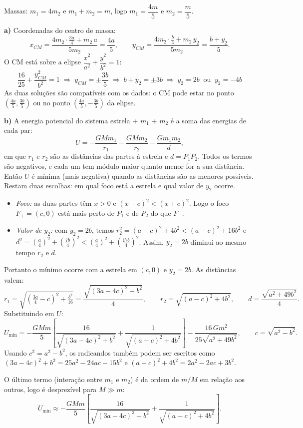 \documentclass{article}%
\begin{document}
Massas: $m_1=4m_2$ e $m_1+m_2=m$, logo $m_1=\dfrac{4m}{5}$ e $m_2=\dfrac{m}{5}$.

\textbf{a)} Coordenadas do centro de massa:
\[
x_{CM}=\frac{4m_2\cdot\frac{3a}{4}+m_2\,a}{5m_2}=\frac{4a}{5},\qquad
y_{CM}=\frac{4m_2\cdot\frac{b}{4}+m_2\,y_2}{5m_2}=\frac{b+y_2}{5}.
\]
O CM está sobre a elipse $\dfrac{x^2}{a^2}+\dfrac{y^2}{b^2}=1$:
\[
\frac{16}{25}+\frac{y_{CM}^2}{b^2}=1\;\Rightarrow\; y_{CM}=\pm\frac{3b}{5}
\;\Rightarrow\; b+y_2=\pm 3b\;\Rightarrow\;
\boxed{y_2=2b\ \text{ ou }\ y_2=-4b}
\]
As duas soluções são compatíveis com os dados: o CM pode estar no ponto $\left(\frac{4a}{5},\frac{3b}{5}\right)$ ou no ponto $\left(\frac{4a}{5},-\frac{3b}{5}\right)$ da elipse.

\textbf{b)} A energia potencial do sistema estrela + $m_1$ + $m_2$ é a soma das energias de cada par:
\[
U=-\frac{GMm_1}{r_1}-\frac{GMm_2}{r_2}-\frac{Gm_1m_2}{d},
\]
em que $r_1$ e $r_2$ são as distâncias das partes à estrela e $d=\overline{P_1P_2}$. Todos os termos são negativos, e cada um tem módulo maior quanto menor for a sua distância. Então $U$ é mínima (mais negativa) quando as distâncias são as menores possíveis. Restam duas escolhas: em qual foco está a estrela e qual valor de $y_2$ ocorre.

\begin{itemize}
\item \emph{Foco:} as duas partes têm $x>0$ e $(x-c)^2<(x+c)^2$. Logo o foco $F_+=(c,0)$ está mais perto de $P_1$ e de $P_2$ do que $F_-$.
\item \emph{Valor de $y_2$:} com $y_2=2b$, temos $r_2^2=(a-c)^2+4b^2<(a-c)^2+16b^2$ e $d^2=\left(\frac a4\right)^2+\left(\frac{7b}{4}\right)^2<\left(\frac a4\right)^2+\left(\frac{17b}{4}\right)^2$. Assim, $y_2=2b$ diminui ao mesmo tempo $r_2$ e $d$.
\end{itemize}

Portanto o mínimo ocorre com a estrela em $(c,0)$ e $y_2=2b$. As distâncias valem:
\[
r_1=\sqrt{\left(\tfrac{3a}{4}-c\right)^2+\tfrac{b^2}{16}}=\frac{\sqrt{(3a-4c)^2+b^2}}{4},\qquad
r_2=\sqrt{(a-c)^2+4b^2},\qquad
d=\frac{\sqrt{a^2+49b^2}}{4}.
\]
Substituindo em $U$:
\[
U_{\min}=-\frac{GMm}{5}\left[\frac{16}{\sqrt{(3a-4c)^2+b^2}}+\frac{1}{\sqrt{(a-c)^2+4b^2}}\right]-\frac{16\,G m^2}{25\sqrt{a^2+49b^2}},
\qquad c=\sqrt{a^2-b^2}.
\]
Usando $c^2=a^2-b^2$, os radicandos também podem ser escritos como $(3a-4c)^2+b^2=25a^2-24ac-15b^2$ e $(a-c)^2+4b^2=2a^2-2ac+3b^2$.

O último termo (interação entre $m_1$ e $m_2$) é da ordem de $m/M$ em relação aos outros, logo é desprezível para $M\gg m$:
\[
U_{\min}\approx-\frac{GMm}{5}\left[\frac{16}{\sqrt{(3a-4c)^2+b^2}}+\frac{1}{\sqrt{(a-c)^2+4b^2}}\right].
\]
\end{document}

